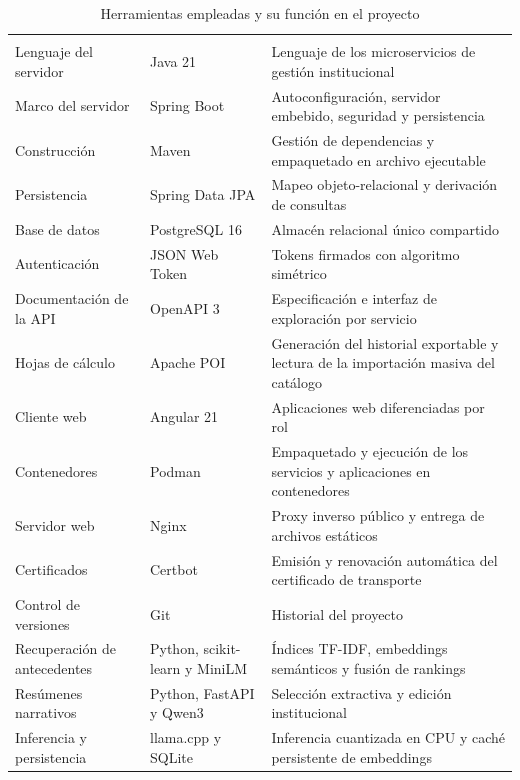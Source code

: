 \begin{longtable}{|p{3.4cm}|p{3.2cm}|p{7.5cm}|}
	\caption{Herramientas empleadas y su función en el proyecto}
	\label{tab:herramientas} \\
	\hline
	\rowcolor{headerblue}
	\headercell{Capa} & \headercell{Herramienta} & \headercell{Función} \\
	\hline
	\endfirsthead

	\hline
	\rowcolor{headerblue}
	\headercell{Capa} & \headercell{Herramienta} & \headercell{Función} \\
	\hline
	\endhead

	Lenguaje del servidor & Java 21 & Lenguaje de los microservicios de gestión institucional \\ \hline
	Marco del servidor & Spring Boot & Autoconfiguración, servidor embebido, seguridad y
	persistencia \\ \hline
	Construcción & Maven & Gestión de dependencias y empaquetado en archivo ejecutable \\ \hline
	Persistencia & Spring Data JPA & Mapeo objeto-relacional y derivación de consultas \\ \hline
	Base de datos & PostgreSQL 16 & Almacén relacional único compartido \\ \hline
	Autenticación & JSON Web Token & Tokens firmados con algoritmo simétrico \\ \hline
	Documentación de la API & OpenAPI 3 & Especificación e interfaz de exploración por servicio
	\\ \hline
	Hojas de cálculo & Apache POI & Generación del historial exportable y lectura de la
	importación masiva del catálogo \\ \hline
	Cliente web & Angular 21 & Aplicaciones web diferenciadas por rol \\ \hline
	Contenedores & Podman & Empaquetado y ejecución de los servicios y aplicaciones en contenedores \\ \hline
	Servidor web & Nginx & Proxy inverso público y entrega de archivos estáticos \\ \hline
	Certificados & Certbot & Emisión y renovación automática del certificado de transporte
	\\ \hline
	Control de versiones & Git & Historial del proyecto \\ \hline
	Recuperación de antecedentes & Python, scikit-learn y MiniLM & Índices TF-IDF, embeddings semánticos y fusión de rankings \\ \hline
	Resúmenes narrativos & Python, FastAPI y Qwen3 & Selección extractiva y edición institucional \\ \hline
	Inferencia y persistencia & llama.cpp y SQLite & Inferencia cuantizada en CPU y caché persistente de embeddings \\ \hline
\end{longtable}

